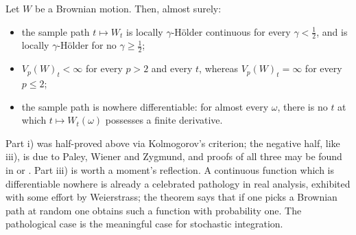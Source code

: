 \begin{theorem}\label{thm:bmregularity}
Let $W$ be a Brownian motion. Then, almost surely:
\begin{itemize}
    \item[i)] the sample path $t \mapsto W_t$ is locally $\gamma$-Hölder continuous for every 
    $\gamma < \tfrac12$, and is locally $\gamma$-Hölder for no $\gamma \geq \tfrac12$;
    \item[ii)] $V_p(W)_t < \infty$ for every $p > 2$ and every $t$, whereas $V_p(W)_t = \infty$ for 
    every $p \leq 2$;
    \item[iii)] the sample path is nowhere differentiable: for almost every $\omega$, there is no 
    $t$ at which $t \mapsto W_t(\omega)$ possesses a finite derivative. \qedopentext
\end{itemize}
\end{theorem}

\vspace{-0.12cm}

Part i) was half-proved above via Kolmogorov's criterion; the negative half, like iii), is due to 
Paley, Wiener and Zygmund, and proofs of all three may be found in \cite{falconer2003} or 
\cite{karatzasshreve1991}. Part iii) is worth a moment's reflection. A continuous function 
which is differentiable nowhere is already a celebrated pathology in real analysis, exhibited with 
some effort by Weierstrass; the theorem says that if one picks a Brownian path at random one 
obtains such a function with probability one. The pathological case is the meaningful case for stochastic integration.

\vspace{-0.45cm}


